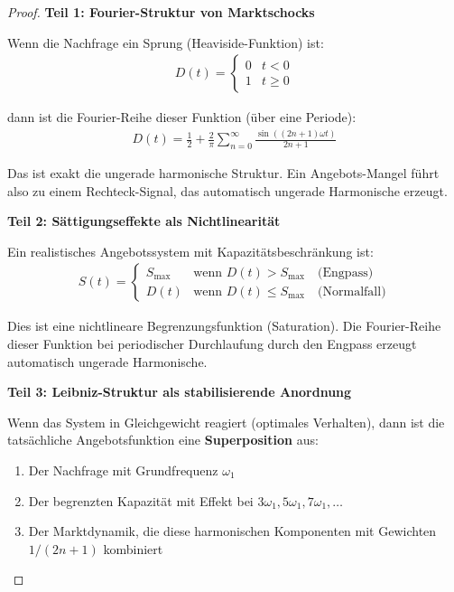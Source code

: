 \documentclass[a4paper,12pt,twoside]{report}
\theoremstyle{definition}
\begin{document}
\begin{proof}

\textbf{Teil 1: Fourier-Struktur von Marktschocks}

Wenn die Nachfrage ein Sprung (Heaviside-Funktion) ist:
\begin{align}
D(t) = \begin{cases} 0 & t < 0 \\ 1 & t \geq 0 \end{cases}
\end{align}

dann ist die Fourier-Reihe dieser Funktion (über eine Periode):
\begin{align}
D(t) = \frac{1}{2} + \frac{2}{\pi} \sum_{n=0}^{\infty} \frac{\sin((2n+1)\omega t)}{2n+1}
\end{align}

Das ist exakt die ungerade harmonische Struktur. Ein Angebots-Mangel führt also zu einem Rechteck-Signal, das automatisch ungerade Harmonische erzeugt.

\textbf{Teil 2: Sättigungseffekte als Nichtlinearität}

Ein realistisches Angebotssystem mit Kapazitätsbeschränkung ist:
\begin{align}
S(t) = \begin{cases} 
S_{\max} & \text{wenn } D(t) > S_{\max} \quad \text{(Engpass)} \\
D(t) & \text{wenn } D(t) \leq S_{\max} \quad \text{(Normalfall)}
\end{cases}
\end{align}

Dies ist eine nichtlineare Begrenzungsfunktion (Saturation). Die Fourier-Reihe dieser Funktion bei periodischer Durchlaufung durch den Engpass erzeugt automatisch ungerade Harmonische.

\textbf{Teil 3: Leibniz-Struktur als stabilisierende Anordnung}

Wenn das System in Gleichgewicht reagiert (optimales Verhalten), dann ist die tatsächliche Angebotsfunktion eine \textbf{Superposition} aus:
\begin{enumerate}
\item Der Nachfrage mit Grundfrequenz $\omega_1$
\item Der begrenzten Kapazität mit Effekt bei $3\omega_1, 5\omega_1, 7\omega_1, \ldots$
\item Der Marktdynamik, die diese harmonischen Komponenten mit Gewichten $1/(2n+1)$ kombiniert
\end{enumerate}


\end{proof}
\end{document}
